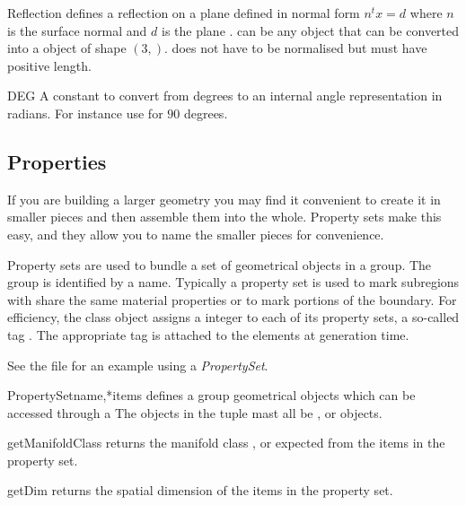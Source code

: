 \begin{classdesc}{Reflection}{}
defines a reflection on a plane defined in normal form $n^t x = d$ 
where $n$ is the surface normal  and $d$ is the plane .
 can be any object that can be converted 
into a \numpy object of shape $(3,)$.
 does not have to be normalised but must have positive length. 
\end{classdesc}

\begin{datadesc}{DEG}
A constant to convert from degrees to an internal angle representation in radians. For instance use  for $90$ degrees.
\end{datadesc}

\subsection{Properties}

If you are building a larger geometry you may find it convenient to
create it in smaller pieces and then assemble them into the whole. 
Property sets make this easy, and they allow you to name the smaller
pieces for convenience.

Property sets are used to bundle a set of geometrical objects in a
group.  The group is identified by a name.  Typically a property set
is used to mark subregions with share the same material properties or
to mark portions of the boundary.  For efficiency, the \Design class
object assigns a integer to each of its property sets, a so-called tag
.  The appropriate tag is attached to the elements at
generation time.

See the file  for an example using a {\it PropertySet}.


\begin{classdesc}{PropertySet}{name,*items}
defines a group geometrical objects which can be accessed through a 
The objects in the tuple  mast all be \ManifoldOneD, \ManifoldTwoD or \ManifoldThreeD objects.
\end{classdesc}


\begin{methoddesc}[PropertySet]{getManifoldClass}{}
returns the manifold class \ManifoldOneD, \ManifoldTwoD or \ManifoldThreeD expected from the items
in the property set.
\end{methoddesc}

\begin{methoddesc}[PropertySet]{getDim}{}
returns the spatial dimension of the items
in the property set. 
\end{methoddesc}

